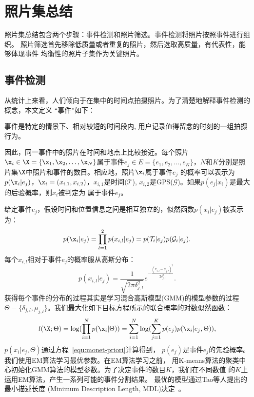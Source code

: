 \section{照片集总结}
照片集总结包含两个步骤：事件检测和照片筛选。事件检测将照片按照事件进行组织。
照片筛选首先移除低质量或者重复的照片，然后选取高质量，有代表性，能够体现事件
均衡性的照片子集作为关键照片。

\subsection{事件检测}
从统计上来看，人们倾向于在集中的时间点拍摄照片。为了清楚地解释事件检测的概念，本文定义
``事件''如下：
\begin{definition}[\textbf{事件}]
    事件是特定的情景下、相对较短的时间段内, 用户记录值得留念的时刻的一组拍摄行为。
\end{definition}
因此，同一事件中的照片在时间和地点上比较接近。每个照片$\x_i \in \X = \{\x_1, \x_2,
\ldots, \x_N\}$属于事件$e_j \in E = \{e_1, e_2, \ldots,
e_K\}$，$N$和$K$分别是照片集$\X$中照片和事件的数目。相应地，照片$\x_i$属于事件$e_j$
的概率可以表示为$p(\x_i|e_j)$，$\x_i=(x_{i,1},
x_{i,2})$，$x_{i,1}$是时间($\mathcal{T}$),
$x_{i,2}$是GPS($\mathcal{G}$)。如果$p(e_j|x_i)$是最大的后验概率，则$x_i$被判定为
属于事件$e_j$。

给定事件$e_j$，假设时间和位置信息之间是相互独立的，似然函数$p(x_i|e_j)$被表示为：
\begin{equation}
    \label{equ:monet-priori}
    p(\x_i|e_j)= \prod_{l=1}^{2}p(x_{i,l}|e_j) = p(\mathcal{T}_i | e_j)p(\mathcal{G}_i | e_j).
\end{equation}
每个$x_{i,l}$相对于事件$e_j$的概率服从高斯分布：
\begin{equation}
    p(x_{i,l}|e_j) =
    \frac{1}{\sqrt{2\pi\delta_{j,l}^2}}e^{-\frac{(x_{i,l}-\mu_{j,l})^2}{2\delta_{j,l}^2}}.
\end{equation}
获得每个事件的分布的过程其实是学习混合高斯模型(GMM)的模型参数的过程$\Theta=\{\delta_{j,l},
\mu_{j,l}\}$。我们最大化如下目标方程所示的联合概率的对数似然函数：
\begin{equation}
    \label{equ:monet-likeli}
    l(\X;\Theta)= \log(\prod_{i=1}^N p(\x_i|\Theta)) =
    \sum_{i=1}^N \log(\sum_{j=1}^K p(e_j)p(\x_i|e_j,\Theta)),
\end{equation}
$p(x_i|e_j,\Theta)$通过方程~\eqref{equ:monet-priori}计算得到，
$p(e_j)$是事件$e_j$的先验概率。我们使用EM算法学习最优参数。在EM算法学习之前，
用K-means算法的聚类中心初始化GMM算法的模型参数。为了决定事件的数目$K$，我们在不同数值
的$K$上运用EM算法，产生一系列可能的事件分割结果。
最优的模型通过Tao等人提出的最小描述长度
(Minimum Description Length, MDL)决定~\cite{mei2006probabilistic}。

